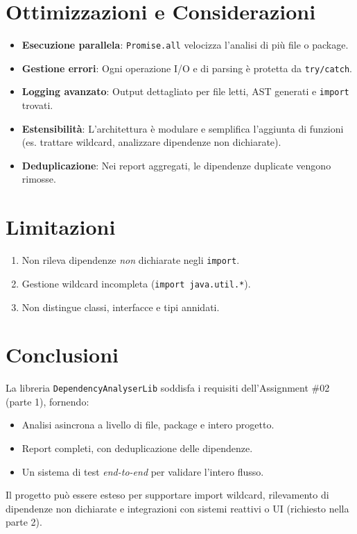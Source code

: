 \documentclass[a4paper,12pt]{article}
\begin{document}
\section{Ottimizzazioni e Considerazioni}
\begin{itemize}
  \item \textbf{Esecuzione parallela}: \texttt{Promise.all} velocizza l'analisi di pi\`u file o package.
  \item \textbf{Gestione errori}: Ogni operazione I/O e di parsing \`e protetta da \texttt{try/catch}.
  \item \textbf{Logging avanzato}: Output dettagliato per file letti, AST generati e \texttt{import} trovati.
  \item \textbf{Estensibilit\`a}: L'architettura \`e modulare e semplifica l'aggiunta di funzioni (es. trattare wildcard, analizzare dipendenze non dichiarate).
  \item \textbf{Deduplicazione}: Nei report aggregati, le dipendenze duplicate vengono rimosse.
\end{itemize}

\section{Limitazioni}
\begin{enumerate}
  \item Non rileva dipendenze \emph{non} dichiarate negli \texttt{import}.
  \item Gestione wildcard incompleta (\texttt{import java.util.*}).
  \item Non distingue classi, interfacce e tipi annidati.
\end{enumerate}

\section{Conclusioni}
La libreria \texttt{DependencyAnalyserLib} soddisfa i requisiti dell'Assignment \#02 (parte 1), fornendo:
\begin{itemize}
  \item Analisi asincrona a livello di file, package e intero progetto.
  \item Report completi, con deduplicazione delle dipendenze.
  \item Un sistema di test \emph{end-to-end} per validare l'intero flusso.
\end{itemize}

Il progetto pu\`o essere esteso per supportare import wildcard, rilevamento di dipendenze non dichiarate e integrazioni con sistemi reattivi o UI (richiesto nella parte 2).
\end{document}
